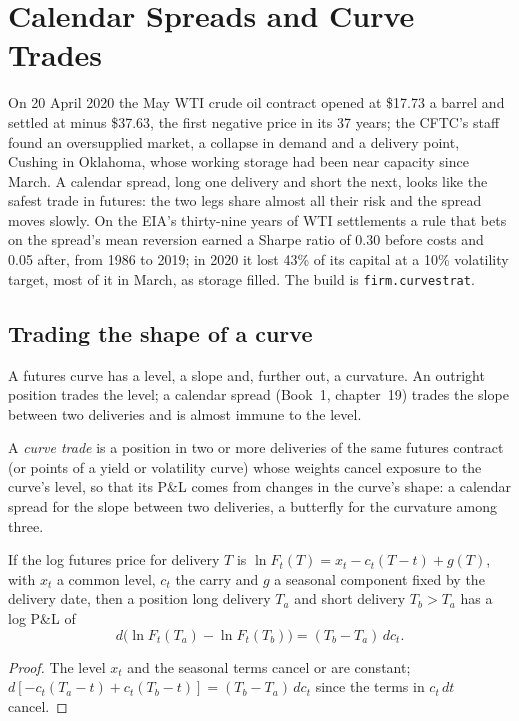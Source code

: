 \chapter{Calendar Spreads and Curve Trades}\label{ch:s1:calendar-spreads-and-curve-trades}

On 20 April 2020 the May WTI crude oil contract opened at \$17.73 a barrel and settled at minus \$37.63, the first negative price in its 37 years; the
CFTC's staff found an oversupplied market, a collapse in demand and a delivery point, Cushing in Oklahoma, whose working storage had been near capacity
since March. A calendar spread, long one delivery and short the next, looks like the safest trade in futures: the two legs share almost all their risk
and the spread moves slowly. On the EIA's thirty-nine years of WTI settlements a rule that bets on the spread's mean reversion earned a Sharpe ratio of
0.30 before costs and 0.05 after, from 1986 to 2019; in 2020 it lost 43\% of its capital at a 10\% volatility target, most of it in March, as storage
filled. The build is \texttt{firm.curvestrat}.

\section{Trading the shape of a curve}

A futures curve has a level, a slope and, further out, a curvature. An outright position trades the level; a calendar spread (Book~1, chapter~19)
trades the slope between two deliveries and is almost immune to the level.

\begin{definition}\label{def:s1:calendar-spreads-and-curve-trades:curve}
A \emph{curve trade} is a position in two or more deliveries of the same futures contract (or points of a yield or volatility curve)
whose weights cancel exposure to the curve's level, so that its P\&L comes from changes in the curve's shape: a calendar spread for the slope between
two deliveries, a butterfly for the curvature among three.
\end{definition}

\begin{proposition}\label{prop:s1:calendar-spreads-and-curve-trades:carry}
If the log futures price for delivery $T$ is $\ln F_t(T) = x_t - c_t (T - t) + g(T)$, with $x_t$ a common level, $c_t$ the carry and $g$ a seasonal
component fixed by the delivery date, then a position long delivery $T_a$ and short delivery $T_b > T_a$ has a log P\&L of
\[
d\big(\ln F_t(T_a) - \ln F_t(T_b)\big) = (T_b - T_a)\, dc_t .
\]
\end{proposition}
\begin{proof}
The level $x_t$ and the seasonal terms cancel or are constant; $d[-c_t(T_a - t) + c_t(T_b - t)] = (T_b - T_a)\,dc_t$ since the terms in $c_t\,dt$
cancel.
\end{proof}

